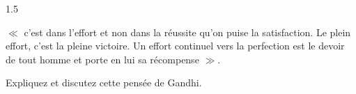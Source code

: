 \documentclass[12pt]{article}
\begin{document}
\begin{spacing}{1.5}

$\ll$ c'est dans l'effort et non dans la réussite qu'on puise la satisfaction. Le plein effort, c'est la pleine victoire. Un effort continuel vers la perfection est le devoir de tout homme et porte en lui sa récompense $\gg$.

Expliquez et discutez cette pensée de Gandhi.


\quad

\end{spacing}
\end{document}
